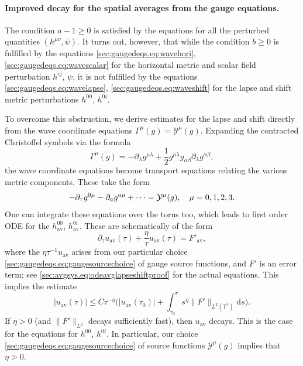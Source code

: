 \documentclass{article}
\newcommand{\TT}{\mathbb{T}}
\newcommand{\av}{\mathrm{av}}
\newcommand{\de}{\mathrm{d}}
\newcommand{\mc}{\mathcal}
\newcommand{\pa}{\partial}
\begin{document}
\paragraph{Improved decay for the spatial averages from the gauge equations.}
The condition $a-1 \geq 0$ is satisfied by the equations for all the perturbed quantities $(h^{\mu\nu},\psi)$. It turns out, however, that while the condition $b \geq 0$ is fulfilled by the equations \eqref{sec:gaugedeqs.eq:wavehori}, \eqref{sec:gaugedeqs.eq:wavescalar} for the horizontal metric and scalar field perturbation $h^{ij}$, $\psi$, it is not fulfilled by the equations \eqref{sec:gaugedeqs.eq:wavelapse}, \eqref{sec:gaugedeqs.eq:waveshift} for the lapse and shift metric perturbations $h^{00}$, $h^{0i}$.

To overcome this obstruction, we derive estimates for the lapse and shift directly from the wave coordinate equations $\Gamma^\mu(g) = \mc{Y}^\mu(g)$. Expanding the contracted Christoffel symbols via the formula
\begin{equation}
    \Gamma^\mu(g) = -\pa_\lambda g^{\mu\lambda} + \frac{1}{2}g^{\mu\lambda}g_{\alpha\beta}\pa_\lambda g^{\alpha\beta},
\end{equation}
the wave coordinate equations become transport equations relating the various metric components. These take the form 
\begin{equation}
    -\pa_\tau g^{0\mu} -\pa_a g^{a\mu} + \dots = \mc{Y}^\mu(g),\quad \mu=0,1,2,3.\\
\end{equation}
One can integrate these equations over the torus too, which leads to first order ODE for the $h_{\av}^{00}$, $h_{\av}^{0i}$. These are schematically of the form
\begin{equation}
    \pa_\tau u_\av(\tau) + \frac{\eta}{\tau}u_\av(\tau) = F'_\av,
\end{equation}
where the $\eta\tau^{-1}u_\av$ arises from our particular choice \eqref{sec:gaugedeqs.eq:gaugesourcechoice} of gauge source functions, and $F'$ is an error term; see \eqref{sec:avgsys.eq:odeavglapseshiftproof} for the actual equations. This implies the estimate
\begin{equation}
    |u_{\av}(\tau)|\leq C\tau^{-\eta}\Big(|u_{\av}(\tau_0)| +\int_{\tau_0}^\tau s^\eta \|F'\|_{L^2(\TT^3)}\de s\Big).
\end{equation}
If $\eta > 0$ (and $\|F'\|_{L^2}$ decays sufficiently fast), then $u_{\av}$ decays. This is the case for the equations for $h^{00}$, $h^{0i}$. In particular, our choice \eqref{sec:gaugedeqs.eq:gaugesourcechoice} of source functions $\mc{Y}^\mu(g)$ implies that $\eta > 0$.
\end{document}
